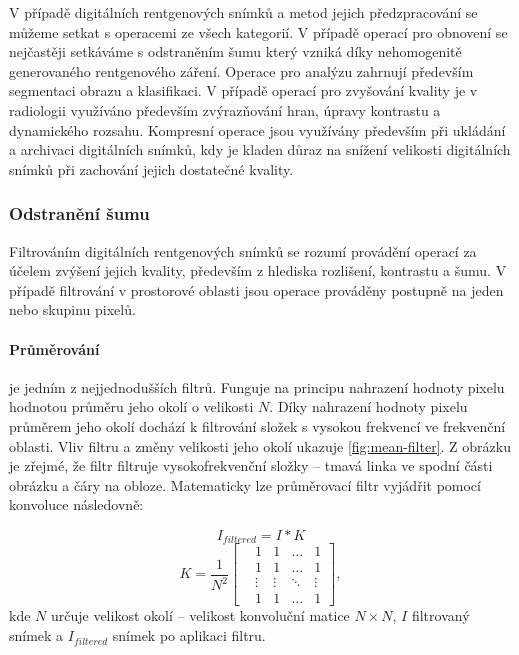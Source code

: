 V případě digitálních rentgenových snímků a metod jejich předzpracování se můžeme setkat s operacemi ze všech kategorií. V případě operací pro obnovení se nejčastěji setkáváme s odstraněním šumu který vzniká díky nehomogenitě generovaného rentgenového záření. Operace pro analýzu zahrnují především segmentaci obrazu a klasifikaci. V případě operací pro zvyšování kvality je v radiologii využíváno především zvýrazňování hran, úpravy kontrastu a dynamického rozsahu. Kompresní operace jsou využívány především při ukládání a archivaci digitálních snímků, kdy je kladen důraz na snížení velikosti digitálních snímků při zachování jejich dostatečné kvality.

\subsubsection{Odstranění šumu}
Filtrováním digitálních rentgenových snímků se rozumí provádění operací za účelem zvýšení jejich kvality, především z hlediska rozlišení, kontrastu a šumu. V případě filtrování v prostorové oblasti jsou operace prováděny postupně na jeden nebo skupinu pixelů.
\paragraph{Průměrování}
je jedním z nejjednodušších filtrů. Funguje na principu nahrazení hodnoty pixelu hodnotou průměru jeho okolí o velikosti $N$. Díky nahrazení hodnoty pixelu průměrem jeho okolí dochází k filtrování složek s vysokou frekvencí ve frekvenční oblasti. Vliv filtru a změny velikosti jeho okolí ukazuje \cref{fig:mean-filter}. Z obrázku je zřejmé, že filtr filtruje vysokofrekvenční složky -- tmavá linka ve spodní části obrázku a čáry na obloze. Matematicky lze průměrovací filtr vyjádřit pomocí konvoluce následovně:

\begin{equation}
\label{eq:mean1}
I_{filtered} = I \ast K
\end{equation}
\begin{equation}
\label{eq:mean2}
K = \frac{1}{N^{2}}\begin{bmatrix}
 &1  &1 &\dots  &1 \\ 
 &1  &1 &\dots  &1 \\ 
 &\vdots  &\vdots &\ddots  &\vdots \\ 
 &1  &1 &\dots  &1 
\end{bmatrix},
\end{equation}
kde $N$ určuje velikost okolí -- velikost konvoluční matice $N\times N$, $I$ filtrovaný snímek a $I_{filtered}$ snímek po aplikaci filtru.

